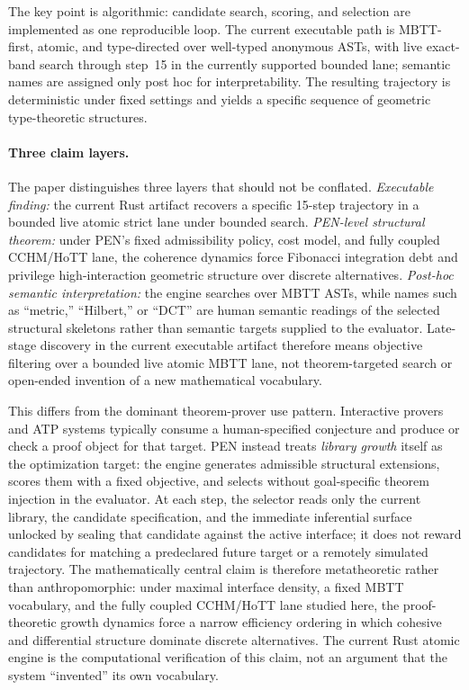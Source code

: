 \documentclass[11pt,a4paper]{article}
\theoremstyle{plain}
\theoremstyle{definition}
\theoremstyle{remark}
\begin{document}
The key point is algorithmic: candidate search, scoring, and selection are implemented as one reproducible loop.
The current executable path is MBTT-first, atomic, and type-directed over well-typed anonymous ASTs, with live exact-band search through step~15 in the currently supported bounded lane; semantic names are assigned only post hoc for interpretability.
The resulting trajectory is deterministic under fixed settings and yields a specific sequence of geometric type-theoretic structures.

\paragraph{Three claim layers.}
The paper distinguishes three layers that should not be conflated.
\emph{Executable finding:} the current Rust artifact recovers a specific 15-step trajectory in a bounded live atomic strict lane under bounded search.
\emph{PEN-level structural theorem:} under PEN's fixed admissibility policy, cost model, and fully coupled CCHM/HoTT lane, the coherence dynamics force Fibonacci integration debt and privilege high-interaction geometric structure over discrete alternatives.
\emph{Post-hoc semantic interpretation:} the engine searches over MBTT ASTs, while names such as ``metric,'' ``Hilbert,'' or ``DCT'' are human semantic readings of the selected structural skeletons rather than semantic targets supplied to the evaluator.
Late-stage discovery in the current executable artifact therefore means objective filtering over a bounded live atomic MBTT lane, not theorem-targeted search or open-ended invention of a new mathematical vocabulary.

This differs from the dominant theorem-prover use pattern.
Interactive provers and ATP systems typically consume a human-specified conjecture and produce or check a proof object for that target.
PEN instead treats \emph{library growth} itself as the optimization target: the engine generates admissible structural extensions, scores them with a fixed objective, and selects without goal-specific theorem injection in the evaluator.
At each step, the selector reads only the current library, the candidate specification, and the immediate inferential surface unlocked by sealing that candidate against the active interface; it does not reward candidates for matching a predeclared future target or a remotely simulated trajectory.
The mathematically central claim is therefore metatheoretic rather than anthropomorphic: under maximal interface density, a fixed MBTT vocabulary, and the fully coupled CCHM/HoTT lane studied here, the proof-theoretic growth dynamics force a narrow efficiency ordering in which cohesive and differential structure dominate discrete alternatives.
The current Rust atomic engine is the computational verification of this claim, not an argument that the system ``invented'' its own vocabulary.
\end{document}
